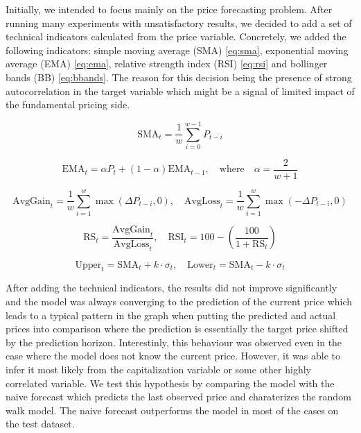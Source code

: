 Initially, we intended to focus mainly on the price forecasting problem.
After running many experiments with unsatisfactory results, we decided to add 
a set of technical indicators calculated from the price variable.
Concretely, we added the following indicators: simple moving average (SMA) \ref{eq:sma},
exponential moving average (EMA) \ref{eq:ema}, relative strength index (RSI) \ref{eq:rsi} and 
bollinger bands (BB) \ref{eq:bbands}. 
The reason for this decision being the presence
of strong autocorrelation in the target variable which
might be a signal of limited impact of the fundamental pricing side. 




\begin{equation}\label{eq:sma}
    \text{SMA}_t = \frac{1}{w} \sum_{i=0}^{w-1} P_{t-i}
\end{equation}

\begin{equation}\label{eq:ema}
    \text{EMA}_t = \alpha P_t + (1 - \alpha) \text{EMA}_{t-1}, \quad \text{where} \quad \alpha = \frac{2}{w + 1}
\end{equation}

\begin{equation}\label{eq:rsi_avg}
    \text{AvgGain}_t = \frac{1}{w} \sum_{i=1}^{w} \max(\Delta P_{t-i}, 0), \quad
    \text{AvgLoss}_t = \frac{1}{w} \sum_{i=1}^{w} \max(-\Delta P_{t-i}, 0)
\end{equation}

\begin{equation}\label{eq:rsi}
    \text{RS}_t = \frac{\text{AvgGain}_t}{\text{AvgLoss}_t}, \quad
    \text{RSI}_t = 100 - \left( \frac{100}{1 + \text{RS}_t} \right)
\end{equation}

\begin{equation}\label{eq:bbands}
    \text{Upper}_t = \text{SMA}_t + k \cdot \sigma_t, \quad
    \text{Lower}_t = \text{SMA}_t - k \cdot \sigma_t
\end{equation}

After adding the technical indicators, the results
did not improve significantly and the model 
was always converging to the prediction of the current price
which leads to a typical pattern in the 
graph when putting the predicted and actual prices into comparison 
where the prediction is essentially
the target price shifted by the prediction horizon.
Interestinly, this behaviour was observed
even in the case where the model does not know
the current price. However, it was able
to infer it most likely from the capitalization variable or some
other highly correlated variable.
We test this hypothesis by comparing
the model with the naive forecast which predicts the last
observed price and charaterizes
the random walk model. The naive forecast outperforms 
the model in most of the cases on the test dataset. 


